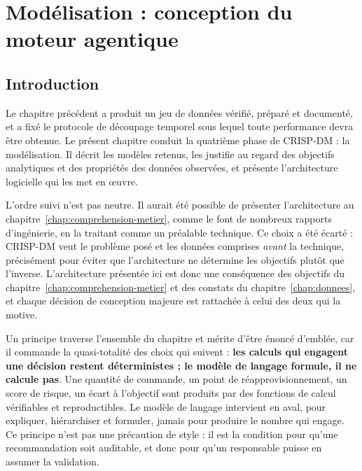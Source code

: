 %

\chapter{Modélisation : conception du moteur agentique}
\label{chap:modelisation}
\minitocsection
\newpage

\section*{Introduction}

Le chapitre précédent a produit un jeu de données vérifié, préparé et documenté, et a fixé le protocole de découpage temporel sous lequel toute performance devra être obtenue. Le présent chapitre conduit la quatrième phase de CRISP-DM : la modélisation. Il décrit les modèles retenus, les justifie au regard des objectifs analytiques et des propriétés des données observées, et présente l'architecture logicielle qui les met en œuvre.

L'ordre suivi n'est pas neutre. Il aurait été possible de présenter l'architecture au chapitre~\ref{chap:comprehension-metier}, comme le font de nombreux rapports d'ingénierie, en la traitant comme un préalable technique. Ce choix a été écarté : CRISP-DM veut le problème posé et les données comprises \textit{avant} la technique, précisément pour éviter que l'architecture ne détermine les objectifs plutôt que l'inverse. L'architecture présentée ici est donc une conséquence des objectifs du chapitre~\ref{chap:comprehension-metier} et des constats du chapitre~\ref{chap:donnees}, et chaque décision de conception majeure est rattachée à celui des deux qui la motive.

Un principe traverse l'ensemble du chapitre et mérite d'être énoncé d'emblée, car il commande la quasi-totalité des choix qui suivent : \textbf{les calculs qui engagent une décision restent déterministes ; le modèle de langage formule, il ne calcule pas}. Une quantité de commande, un point de réapprovisionnement, un score de risque, un écart à l'objectif sont produits par des fonctions de calcul vérifiables et reproductibles. Le modèle de langage intervient en aval, pour expliquer, hiérarchiser et formuler, jamais pour produire le nombre qui engage. Ce principe n'est pas une précaution de style : il est la condition pour qu'une recommandation soit auditable, et donc pour qu'un responsable puisse en assumer la validation.

